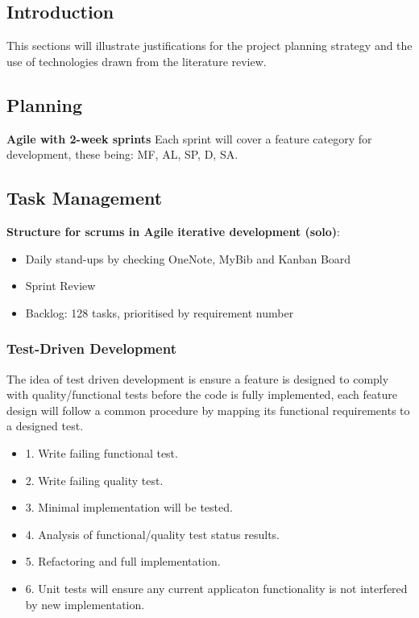 \documentclass{article}
\begin{document}
\subsection{Introduction}
This sections will illustrate justifications for the project planning strategy and the use of technologies drawn from the literature review.
\subsection{Planning}
\textbf{Agile with 2-week sprints} Each sprint will cover a feature category for development, these being: MF, AL, SP, D, SA.


\subsection{Task Management}
\textbf{Structure for scrums in Agile iterative development (solo)}:
\begin{itemize}
\item Daily stand-ups by checking OneNote, MyBib and Kanban Board 
\item Sprint Review 
\item Backlog: 128 tasks, prioritised by requirement number %
\end{itemize}

\subsubsection{Test-Driven Development}
The idea of test driven development is ensure a feature is designed to comply with quality/functional tests before the code is fully implemented, each feature design will follow a common procedure by mapping its functional requirements to a designed test.
\begin{itemize}
    \item 1. Write failing functional test.
    \item 2. Write failing quality test.
    \item 3. Minimal implementation will be tested.
    \item 4. Analysis of functional/quality test status results.
    \item 5. Refactoring and full implementation.
    \item 6. Unit tests will ensure any current applicaton functionality is not interfered by new implementation.
\end{itemize}
\end{document}
